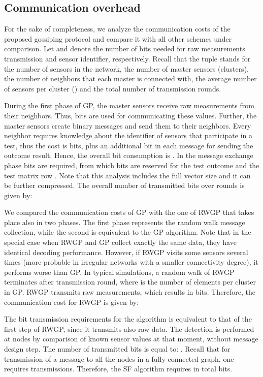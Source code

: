 \documentclass[journal]{IEEEtran}
\begin{document}
\subsection{Communication overhead}\label{ssec:phaseI}
For the sake of completeness, we analyze the communication costs of the proposed gossiping protocol and compare it with all other schemes under comparison. Let  and  denote the number of bits needed for raw measurements transmission and sensor identifier, respectively. Recall that the tuple  stands for the number of sensors in the network, the number of master sensors (clusters), the number of neighbors that each master is connected with, the average number of sensors per cluster () and the total number of transmission rounds.
 
During the first phase of GP, the master sensors receive raw measurements from their neighbors. Thus,  bits are used for communicating these values. Further, the master sensors create binary messages and send them to their neighbors. Every neighbor requires knowledge about the identifier of sensors that participate in a test, thus the cost is  bits, plus an additional bit in each message for sending the outcome result. Hence, the overall bit consumption is . In the message exchange phase  bits are required, from which  bits are reserved for the test outcome and the test matrix row . Note that this analysis includes the full vector size and it can be further compressed. The overall number of transmitted bits over  rounds is given by:


We compared the communication costs of GP with the one of RWGP that takes place also in two phases. The first phase represents the random walk message collection, while the second is equivalent to the GP algorithm. Note that in the special case when RWGP and GP collect exactly the same data, they have identical decoding performance. However, if RWGP visits some sensors several times (more probable in irregular networks with a smaller connectivity degree), it performs worse than GP. In typical simulations, a random walk of RWGP terminates after  transmission round, where  is the number of elements per cluster in GP. RWGP transmits raw measurements, which results in  bits. Therefore, the communication cost for RWGP is given by:


The bit transmission requirements for the  algorithm is equivalent to that of the first step of RWGP, since it transmits also raw data. The detection is performed at nodes by comparison of known sensor values at that moment, without message design step. The number of transmitted bits is equal to: . Recall that for transmission of a message to all the nodes in a fully connected graph, one requires  transmissions. Therefore, the SF algorithm requires in total  bits.
\end{document}
